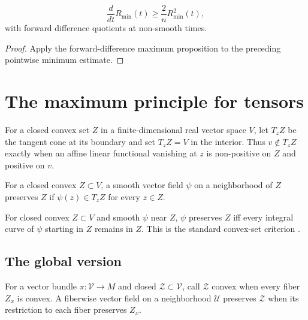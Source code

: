 \begin{claim}
\label{claim:scalar-min-forward-difference}
\label{Rminprime}
\[
\frac{d}{dt}R_\mathrm{min}(t)\ge\frac{2}{n}R_\mathrm{min}^2(t),
\]
with forward difference quotients at non-smooth times.
\end{claim}
\begin{proof}
\sketch Apply the forward-difference maximum proposition to the preceding
pointwise minimum estimate.
\end{proof}

\section{The maximum principle for tensors}

For a closed convex set $Z$ in a finite-dimensional real vector space $V$,
let $T_zZ$ be the tangent cone at its boundary and set $T_zZ=V$ in the
interior. Thus $v\notin T_zZ$ exactly when an affine linear functional
vanishing at $z$ is non-positive on $Z$ and positive on $v$.

\begin{definition}
\label{def:vector-field-preserves-convex-set}
For a closed convex $Z\subset V$, a smooth vector field $\psi$ on a
neighborhood of $Z$ preserves $Z$ if $\psi(z)\in T_zZ$ for every $z\in Z$.
\end{definition}

\begin{lemma}
\label{lem:integral-curve-preserves-convex-set}

For closed convex $Z\subset V$ and smooth $\psi$ near $Z$, $\psi$ preserves
$Z$ iff every integral curve of $\psi$ starting in $Z$ remains in $Z$.
This is the standard convex-set criterion \cite{Hamilton4MPCO}.
\end{lemma}

\subsection{The global version}\label{4.3.3}

\begin{definition}
\label{def:convex-subbundle-preserving-vector-field}

For a vector bundle $\pi:{\mathcal V}\to M$ and closed ${\mathcal Z}\subset
{\mathcal V}$, call ${\mathcal Z}$ convex when every fiber $Z_x$ is convex.
A fiberwise vector field on a neighborhood ${\mathcal U}$ preserves ${\mathcal Z}$
when its restriction to each fiber preserves $Z_x$.
\end{definition}


